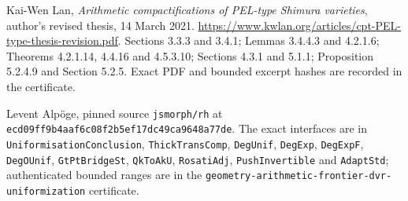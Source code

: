 Kai-Wen Lan, \emph{Arithmetic compactifications of PEL-type Shimura
varieties}, author's revised thesis, 14 March 2021.
\url{https://www.kwlan.org/articles/cpt-PEL-type-thesis-revision.pdf}.
Sections 3.3.3 and 3.4.1; Lemmas 3.4.4.3 and 4.2.1.6; Theorems 4.2.1.14,
4.4.16 and 4.5.3.10; Sections 4.3.1 and 5.1.1;
Proposition 5.2.4.9 and Section 5.2.5.
Exact PDF and bounded excerpt hashes are recorded in the certificate.

Levent Alp\"oge, pinned source \texttt{jsmorph/rh} at
\texttt{ecd09ff9b4aaf6c08f2b5ef17dc49ca9648a77de}.
The exact interfaces are in \texttt{UniformisationConclusion},
\texttt{ThickTransComp}, \texttt{DegUnif}, \texttt{DegExp},
\texttt{DegExpF}, \texttt{DegOUnif}, \texttt{GtPtBridgeSt},
\texttt{QkToAkU}, \texttt{RosatiAdj}, \texttt{PushInvertible}
and \texttt{AdaptStd}; authenticated bounded ranges are in the
\texttt{geometry-arithmetic-frontier-dvr-uniformization} certificate.
